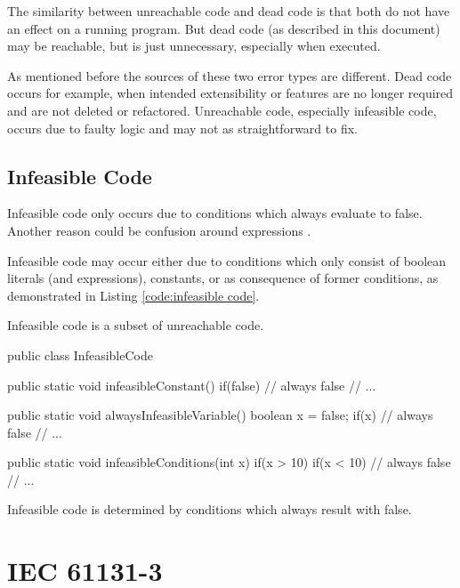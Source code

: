 The similarity between unreachable code and dead code is that both do not have an effect on a running program. But dead code (as described in this document) may be reachable, but is just unnecessary, especially when executed. 


As mentioned before the sources of these two error types are different.
Dead code occurs for example, when intended extensibility or features are no longer required and are not deleted or refactored.
Unreachable code, especially infeasible code, occurs due to faulty logic and may not as straightforward to fix.
\subsection{Infeasible Code}
\label{sub:infeasible code}

Infeasible code only occurs due to conditions which always evaluate to false. Another reason could be confusion around expressions \cite{Eichberg_2015}.


Infeasible code may occur either due to conditions which only consist of boolean literals (and expressions), constants, or as consequence of former conditions, as demonstrated in Listing \ref{code:infeasible code}.

Infeasible code is a subset of unreachable code.
\begin{program}
	\begin{JavaCode}
		public class InfeasibleCode {
			public static void infeasibleConstant() {
				if(false) {
					// always false
					// ...
				}
			}
			
			public static void alwaysInfeasibleVariable() {
				boolean x = false;
				if(x) {
					// always false
					// ...
				}
			}
			
			public static void infeasibleConditions(int x) {
				if(x > 10) {
					if(x < 10) {
						// always false
						// ...
					}
				}
			}
	}\end{JavaCode}
	\caption{Infeasible code is determined by conditions which always result with false. }
	\label{code:infeasible code}
\end{program}




\section{IEC 61131-3}
\label{sec:iec}

